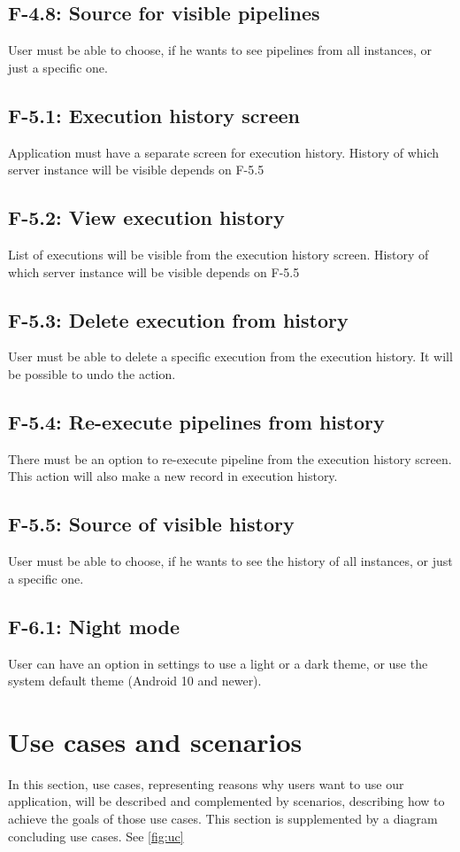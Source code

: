 \subsection*{F-4.8: Source for visible pipelines}
User must be able to choose, if he wants to see pipelines from all instances, or just a specific one.
\subsection*{F-5.1: Execution history screen}
Application must have a separate screen for execution history. History of which server instance will be visible depends on F-5.5
\subsection*{F-5.2: View execution history}
List of executions will be visible from the execution history screen. History of which server instance will be visible depends on F-5.5
\subsection*{F-5.3: Delete execution from history}
User must be able to delete a specific execution from the execution history. It will be possible to undo the action.
\subsection*{F-5.4: Re-execute pipelines from history}
There must be an option to re-execute pipeline from the execution history screen. This action will also make a new record in execution history.
\subsection*{F-5.5: Source of visible history}
User must be able to choose, if he wants to see the history of all instances, or just a specific one.
\subsection*{F-6.1: Night mode}
User can have an option in settings to use a light or a dark theme, or use the system default theme (Android 10 and newer).












\section{Use cases and scenarios}
In this section, use cases, representing reasons why users want to use our application, will be described and complemented by scenarios, describing how to achieve the goals of those use cases.
This section is supplemented by a diagram concluding use cases.
See \autoref{fig:uc}


